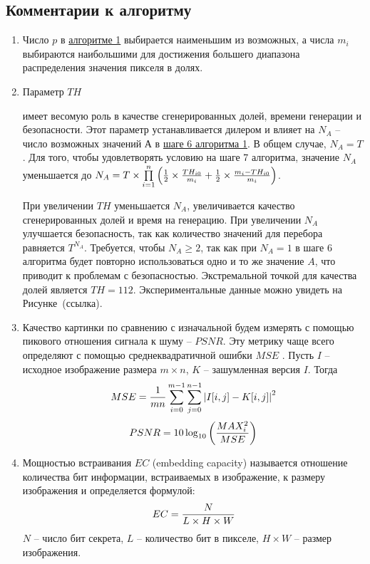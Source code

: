 \documentclass[a4paper,article,14pt]{extarticle}
\begin{document}
\subsection{Комментарии к алгоритму}
\begin{enumerate}
    \item Число $p$ в \hyperlink{generation_alg}{алгоритме 1} выбирается наименьшим из возможных, а числа $m_i$ выбираются наибольшими для достижения 
    большего диапазона распределения значения пикселя в долях.

    \item \hypertarget{comments}{Параметр $TH$} имеет весомую роль в качестве сгенерированных долей, времени генерации и безопасности. Этот параметр устанавливается 
    дилером и влияет на $N_A$ -- число возможных значений А в \hyperlink{step6_1}{шаге 6 алгоритма 1}.
    В общем случае, $N_A = T$. Для того, чтобы удовлетворять условию на шаге 7 алгоритма, значение $N_A$ уменьшается до 
    $N_A = T \times \prod\limits_{i = 1}^n \left({1\over 2} \times {TH_{i0}\over m_i} + {1\over 2} \times {{m_i - TH_{i0}}\over m_i}\right)$.
    
    При увеличении $TH$ уменьшается $N_A$, увеличивается качество сгенерированных долей и время на генерацию.
    При увеличении $N_A$ улучшается безопасность, так как количество значений для перебора равняется $T^{N_A}$. 
    Требуется, чтобы $N_A \geq 2$, так как при $N_A = 1$ в шаге 6 алгоритма будет 
    повторно использоваться одно и то же значение $A$, что приводит к проблемам с безопасностью. Экстремальной точкой для качества долей 
    является $TH = 112$. Экспериментальные данные можно увидеть на Рисунке~(ссылка). 

    \item Качество картинки по сравнению с изначальной будем измерять с помощью пикового отношения сигнала к шуму -- $PSNR$. Эту метрику чаще всего 
    определяют с помощью среднеквадратичной ошибки $MSE$ \cite{metrics}. Пусть $I$ -- исходное изображение размера $m \times n$, $K$ -- зашумленная версия $I$. Тогда 
    \begin{equation}
        MSE = {1\over mn} \sum_{i=0}^{m-1} \sum_{j=0}^{n-1}{|I[i, j] - K[i, j]|}^2
    \end{equation}
    \begin{equation}
        PSNR = 10 \log_{10}\left({{MAX_i^2} \over {MSE}} \right)
        \label{eq:RSNR}
    \end{equation}

    \item Мощностью встраивания $EC$ (embedding capacity) \cite{metrics} называется отношение количества бит информации, встраиваемых в изображение, к размеру изображения 
    и определяется формулой:
    $$EC = {N\over{L\times H \times W}}$$
    $N$ -- число бит секрета, $L$ -- количество бит в пикселе, $H \times W$ -- размер изображения.
    

\end{enumerate}
\end{document}
